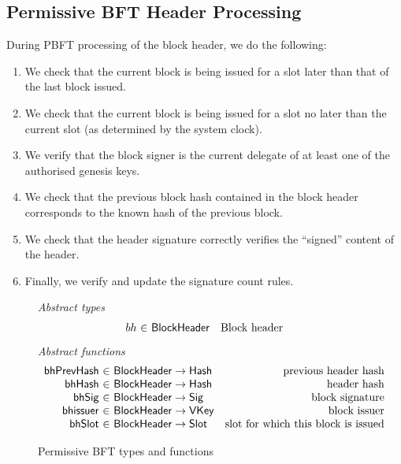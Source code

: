 \documentclass[11pt,a4paper]{article}
\newcommand{\fun}[1]{\mathsf{#1}}
\newcommand{\type}[1]{\mathsf{#1}}
\newcommand{\totalf}{\to}
\newcommand{\Hash}{\type{Hash}}  %
\newcommand{\Slot}{\type{Slot}}
\newcommand{\VKey}{\type{VKey}}
\newcommand{\Sig}{\type{Sig}}
\newcommand{\bhsigname}{bhSig}
\newcommand{\bhissuername}{bhissuer}
\begin{document}
\clearpage

\subsection{Permissive BFT Header Processing}

\newcommand{\PBFTEnv}{\type{PBFTEnv}}
\newcommand{\PBFTState}{\type{PBFTState}}

\newcommand{\Bhead}{\type{BlockHeader}}
\newcommand{\Bhtosign}{\type{BHToSign}}

\newcommand{\bhslotname}{bhSlot}
\newcommand{\bhslot}[1]{\fun{\bhslotname}\ #1}
\newcommand{\bhhashname}{bhHash}
\newcommand{\bhhash}[1]{\fun{\bhhashname}\ #1}
\newcommand{\bhprevhashname}{bhPrevHash}
\newcommand{\bhprevhash}[1]{\fun{\bhprevhashname}\ #1}
\newcommand{\bhtosignname}{bhToSign}
\newcommand{\bhtosign}[1]{\fun{\bhtosignname}\ #1}

During PBFT processing of the block header, we do the following:
\begin{enumerate}
 \item We check that the current block is being issued for a slot later than
    that of the last block issued.
  \item We check that the current block is being issued for a slot no later than
    the current slot (as determined by the system clock).
  \item We verify that the block signer is the current delegate of at least one
    of the authorised genesis keys.
  \item We check that the previous block hash contained in the block header
    corresponds to the known hash of the previous block.
  \item We check that the header signature correctly verifies the ``signed''
    content of the header.
  \item Finally, we verify and update the signature count rules.
  \end{enumerate}
  \begin{figure}[ht]
  \emph{Abstract types}
  \begin{equation*}
    \begin{array}{r@{~\in~}lr}
      bh & \Bhead & \text{Block header}
    \end{array}
  \end{equation*}
  \emph{Abstract functions}
  \begin{equation*}
    \begin{array}{r@{~\in~}lr}
      \fun{\bhprevhashname} & \Bhead \totalf \Hash & \text{previous header hash} \\
      \fun{\bhhashname} & \Bhead \totalf \Hash & \text{header hash} \\
      \fun{\bhsigname} & \Bhead \totalf \Sig & \text{block signature} \\
      \fun{\bhissuername} & \Bhead \totalf \VKey & \text{block issuer} \\
      \fun{\bhslotname} & \Bhead \totalf \Slot & \text{slot for which this block is issued}
    \end{array}
  \end{equation*}
  \caption{Permissive BFT types and functions}
  \label{fig:defs:pbft}
\end{figure}
\end{document}

